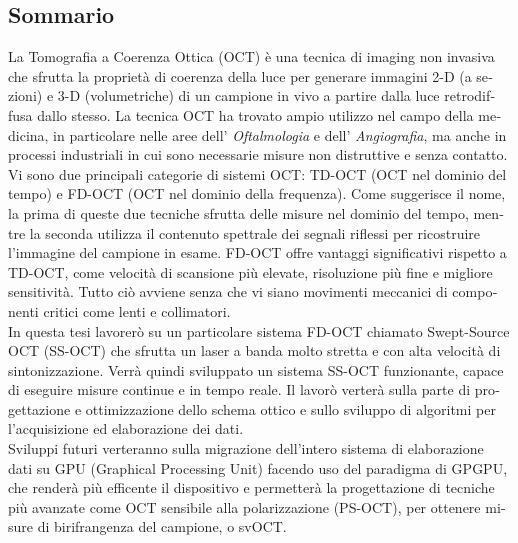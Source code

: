 \begin{otherlanguage}{italian}
\chapter*{Sommario}
La Tomografia a Coerenza Ottica (\acs{OCT}) è una tecnica di imaging non invasiva che sfrutta la proprietà di coerenza della luce per generare immagini 2-D (a sezioni) e 3-D (volumetriche) di un campione in vivo a partire dalla luce retrodiffusa dallo stesso. La tecnica OCT ha trovato ampio utilizzo nel campo della medicina, in particolare nelle aree dell' \emph{Oftalmologia} e dell' \emph{Angiografia}, ma anche in processi industriali in cui sono necessarie misure non distruttive e senza
contatto. \\

\noindent Vi sono due principali categorie di sistemi OCT: TD-OCT (OCT nel dominio del tempo) e FD-OCT (OCT nel dominio della frequenza). Come suggerisce il nome, la prima di queste due tecniche sfrutta delle misure nel dominio del tempo, mentre la seconda utilizza il contenuto spettrale dei segnali riflessi per ricostruire l'immagine del campione in esame. FD-OCT offre vantaggi significativi rispetto a TD-OCT, come velocità di scansione più elevate, risoluzione più fine e migliore
sensitività. Tutto ciò avviene senza che vi siano movimenti meccanici di componenti critici come lenti e collimatori. \\

\noindent In questa tesi lavorerò su un particolare sistema FD-OCT chiamato Swept-Source OCT (\ac{SS-OCT}) che sfrutta un laser a banda molto stretta e con alta velocità di sintonizzazione. Verrà quindi sviluppato un sistema SS-OCT funzionante, capace di eseguire misure continue e in tempo reale. Il lavorò verterà sulla parte di progettazione e ottimizzazione dello schema ottico e sullo sviluppo di algoritmi per l'acquisizione ed elaborazione dei dati. \\

\noindent Sviluppi futuri verteranno sulla migrazione dell'intero sistema di elaborazione dati su GPU (Graphical Processing Unit) facendo uso del paradigma di \acf {GPGPU}, che renderà più efficente il dispositivo e permetterà la progettazione di tecniche più avanzate come OCT sensibile alla polarizzazione (\acs{PS-OCT}), per ottenere misure di birifrangenza del campione, o \acf{svOCT}.
\end{otherlanguage}

\endgroup

\vfill

